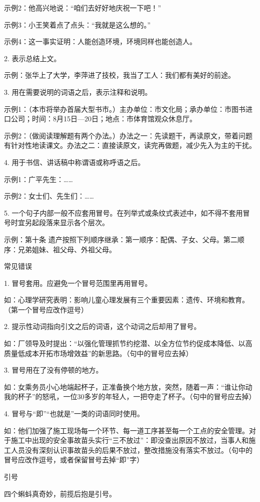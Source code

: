 示例2：他高兴地说：“咱们去好好地庆祝一下吧！”

示例3：小王笑着点了点头：“我就是这么想的。”

示例4：这一事实证明：人能创造环境，环境同样也能创造人。

2. 表示总结上文。

示例：张华上了大学，李萍进了技校，我当了工人：我们都有美好的前途。

3. 用在需要说明的词语之后，表示注释和说明。

示例1：（本市将举办首届大型书市。）主办单位：市文化局；承办单位：市图书进口公司；时间：8月15日—20日；地点：市体育馆观众休息厅。

示例2：（做阅读理解题有两个办法。）办法之一：先读题干，再读原文，带着问题有针对性地读课文。办法之二：直接读原文，读完再做题，减少先入为主的干扰。

4. 用于书信、讲话稿中称谓语或称呼语之后。

示例1：广平先生：……

示例2：女士们、先生们：……

5. 一个句子内部一般不应套用冒号。在列举式或条纹式表述中，如不得不套用冒号时宜另起段落来显示各个层次。

示例：第十条 遗产按照下列顺序继承：第一顺序：配偶、子女、父母。第二顺序：兄弟姐妹、祖父母、外祖父母。

常见错误

1. 冒号套用。应避免一个冒号范围里再用冒号。

如：心理学研究表明：影响儿童心理发展有三个重要因素：遗传、环境和教育。（第一个冒号应改作逗号）

2. 提示性动词指向引文之后的词语，这个动词之后却用了冒号。

如：厂领导及时提出：“以强化管理抓节约挖潜、以全方位节约促成本降低、以高质量低成本开拓市场增效益”的新思路。（句中的冒号应去掉）

3. 冒号用在了没有停顿的地方。

如：女乘务员小心地端起杯子，正准备换个地方放，突然，随着一声：“谁让你动我的杯子”的怒吼，一位30多岁的年轻人，一把夺走了杯子。（句中的冒号应去掉）

4. 冒号与“即”“也就是”一类的词语同时使用。

如：他们加强了施工现场每一个环节、每一道工序甚至每一个工点的安全管理。对于施工中出现的安全事故苗头实行“三不放过”：即没查出原因不放过，当事人和施工人员没有深刻认识事故苗头的后果不放过，整改措施没有落实不放过。（句中的冒号应改作逗号，或者保留冒号去掉“即”字）

引号

四个蝌蚪真奇妙，前揽后抱是引号。

